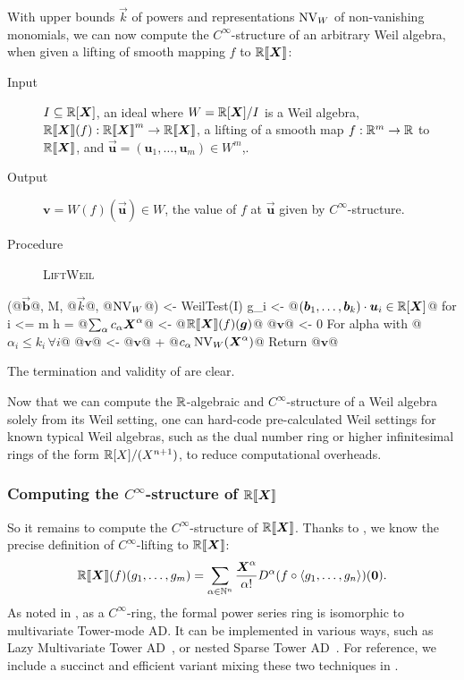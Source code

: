 \documentclass[runningheads]{llncs}
\begin{document}
With upper bounds $\vec k$ of powers and representations $\operatorname{NV}_W$ of non-vanishing monomials, we can now compute the $C^\infty$-structure of an arbitrary Weil algebra, when given a lifting of smooth mapping $f$ to $\mathord{\mathbb{R}\llbracket\boldsymbol{X}\rrbracket}$:

\begin{algorithm}\label{alg:smooth-weil}
  \hfill\vspace{-.25em}
  \begin{description}
    \item[Input]
      $I \subseteq \mathbb{R}[\boldsymbol{X}]$, an ideal where $W = \mathbb{R}[\boldsymbol{X}]/I$ is a Weil algebra,
      $\mathbb{R} \llbracket\boldsymbol{X}\rrbracket(f): \mathord{\mathbb{R}\llbracket\boldsymbol{X}\rrbracket}^m \to \mathord{\mathbb{R}\llbracket\boldsymbol{X}\rrbracket}$, a lifting of a smooth map $f: \mathbb{R}^m \to \mathbb{R}$ to $\mathord{\mathbb{R}\llbracket\boldsymbol{X}\rrbracket}$, and $\vec{\boldsymbol{u}} = (\boldsymbol{u}_1, \dots, \boldsymbol{u}_m) \in W^m$,.
    \item[Output] $\boldsymbol{v} = W(f)(\vec{\boldsymbol u}) \in W$, the value of $f$ at $\vec{\boldsymbol{u}}$ given by $C^\infty$-structure.
    \item[Procedure] \textup{\textsc{LiftWeil}}
  \end{description}
\begin{alg}
(@$\vec{\boldsymbol{b}}$@, M, @$\vec{k}$@, @$\operatorname{NV}_W$@) <- WeilTest(I)
g_i <- @$(\boldsymbol{b}_1, \dots, \boldsymbol{b}_k) \cdot \boldsymbol{u}_i \in \mathbb{R}[\boldsymbol{X}]$@ for i <= m
h = @$\sum_\alpha c_\alpha \boldsymbol{X}^\alpha$@ <- @$\Rseries(f)(\vec{g})$@
@$\boldsymbol v$@ <- 0
For alpha with @$\alpha_i \leq k_i\, \forall i$@
  @$\boldsymbol{v}$@ <- @$\boldsymbol v$@ + @$c_\alpha \operatorname{NV}_W(\boldsymbol{X}^\alpha)$@
Return @$\boldsymbol{v}$@
\end{alg}
\end{algorithm}

The termination and validity of  are clear.

Now that we can compute the $\mathbb{R}$-algebraic and $C^\infty$-structure of a Weil algebra solely from its Weil setting, one can hard-code pre-calculated Weil settings for known typical Weil algebras, such as the dual number ring or higher infinitesimal rings of the form $\mathbb{R}[X]/(X^{n+1})$, to reduce computational overheads.

\subsubsection{Computing the $C^\infty$-structure of $\mathord{\mathbb{R}\llbracket\boldsymbol{X}\rrbracket}$}\label{sec:power-series-lifting}
So it remains to compute the $C^\infty$-structure of $\mathord{\mathbb{R}\llbracket\boldsymbol{X}\rrbracket}$.
Thanks to , we know the precise definition of $C^\infty$-lifting to $\mathord{\mathbb{R}\llbracket\boldsymbol{X}\rrbracket}$:
\[
  \mathord{\mathbb{R}\llbracket\boldsymbol{X}\rrbracket}(f)(g_1, \dots, g_m) = \sum_{\alpha \in \mathbb{N}^n} \frac{\boldsymbol{X}^\alpha}{\alpha!} D^\alpha(f \circ \braket{g_1, \dots, g_n})(\boldsymbol{0}).
\]
As noted in , as a $C^\infty$-ring, the formal power series ring is isomorphic to multivariate Tower-mode AD.
It can be implemented in various ways, such as Lazy Multivariate Tower AD~\cite{Pearlmutter:2007aa}, or nested Sparse Tower AD~\cite[{module \texttt{Numeric.AD.Rank1.Sparse}}]{Kmett:2010aa}.
For reference, we include a succinct and efficient variant mixing these two techniques in .
\end{document}
